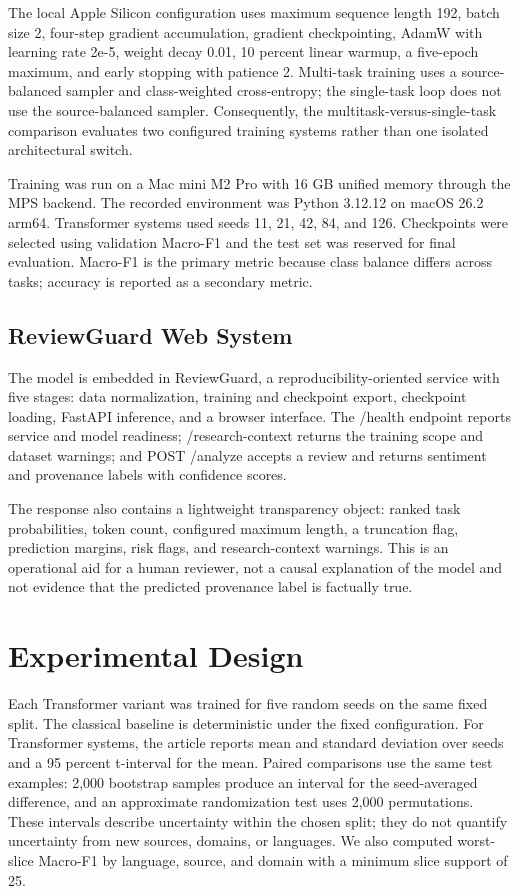 \documentclass[11pt,a4paper]{article}
\begin{document}
The local Apple Silicon configuration uses maximum sequence length 192,
batch size 2, four-step gradient accumulation, gradient checkpointing,
AdamW with learning rate 2e-5, weight decay 0.01, 10 percent linear
warmup, a five-epoch maximum, and early stopping with patience 2.
Multi-task training uses a source-balanced sampler and class-weighted
cross-entropy; the single-task loop does not use the source-balanced
sampler. Consequently, the multitask-versus-single-task comparison
evaluates two configured training systems rather than one isolated
architectural switch.

Training was run on a Mac mini M2 Pro with 16 GB unified memory through
the MPS backend. The recorded environment was Python 3.12.12 on macOS
26.2 arm64. Transformer systems used seeds 11, 21, 42, 84, and 126.
Checkpoints were selected using validation Macro-F1 and the test set was
reserved for final evaluation. Macro-F1 is the primary metric because
class balance differs across tasks; accuracy is reported as a secondary
metric.

\subsection{ReviewGuard Web System}

The model is embedded in ReviewGuard, a reproducibility-oriented service
with five stages: data normalization, training and checkpoint export,
checkpoint loading, FastAPI inference, and a browser interface. The
/health endpoint reports service and model readiness; /research-context
returns the training scope and dataset warnings; and POST /analyze
accepts a review and returns sentiment and provenance labels with
confidence scores.

The response also contains a lightweight transparency object: ranked
task probabilities, token count, configured maximum length, a truncation
flag, prediction margins, risk flags, and research-context warnings.
This is an operational aid for a human reviewer, not a causal
explanation of the model and not evidence that the predicted provenance
label is factually true.

\section{Experimental Design}

Each Transformer variant was trained for five random seeds on the same
fixed split. The classical baseline is deterministic under the fixed
configuration. For Transformer systems, the article reports mean and
standard deviation over seeds and a 95 percent t-interval for the mean.
Paired comparisons use the same test examples: 2,000 bootstrap samples
produce an interval for the seed-averaged difference, and an approximate
randomization test uses 2,000 permutations. These intervals describe
uncertainty within the chosen split; they do not quantify uncertainty
from new sources, domains, or languages. We also computed worst-slice
Macro-F1 by language, source, and domain with a minimum slice support of
25.
\end{document}
